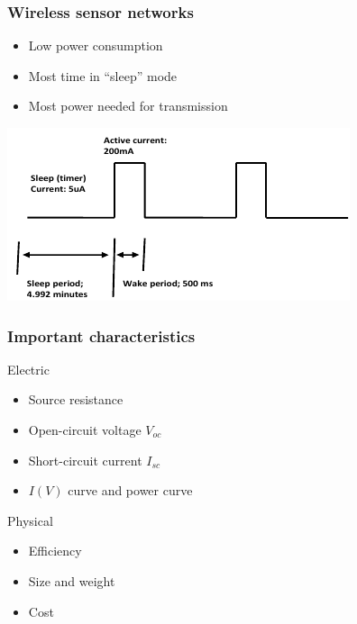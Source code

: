\documentclass{beamer}
\begin{document}
\begin{frame}
  \frametitle{Wireless sensor networks}

  \begin{itemize}
   \item Low power consumption
   \item Most time in ``sleep'' mode
   \item Most power needed for transmission
  \end{itemize}

\begin{center}
  \includegraphics[width=\textwidth]{./Slike/wsn-current-profile}
\end{center}

\end{frame}

\begin{frame}
  \frametitle{Important characteristics}
\begin{block}{Electric}
\begin{itemize}
  \item Source resistance
  \item Open-circuit voltage $V_{oc}$
  \item Short-circuit current $I_{sc}$
  \item $I(V)$ curve and power curve
\end{itemize}
\end{block}

\begin{block}{Physical}
\begin{itemize}
  \item Efficiency
  \item Size and weight
  \item Cost
\end{itemize}
\end{block}

\end{frame}
\end{document}
